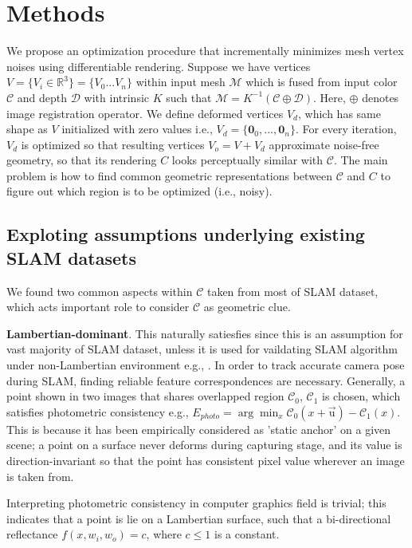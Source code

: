 \section{Methods}

We propose an optimization procedure that incrementally minimizes mesh vertex noises using differentiable rendering. 
Suppose we have vertices $V=\{V_i\in\mathbb{R}^3\}=\{V_0...V_n\}$ within input mesh $\mathcal{M}$ which is fused from input color $\mathcal{C}$ and depth $\mathcal{D}$ with intrinsic $K$ such that $\mathcal{M}=K^{-1}\left(\mathcal{C}\oplus \mathcal{D}\right)$. 
Here, $\oplus$ denotes image registration operator.
We define deformed vertices $V_d$, which has same shape as $V$ initialized with zero values i.e., $V_d=\{\mathbf{0}_0,...,\mathbf{0}_n\}$. 
For every iteration, $V_d$ is optimized so that resulting vertices $V_o=V+V_d$ approximate noise-free geometry, so that its rendering $C$ looks perceptually similar with $\mathcal{C}$. 
The main problem is how to find common geometric representations between $\mathcal{C}$ and $C$ to figure out which region is to be optimized (i.e., noisy). 

\subsection{Exploting assumptions underlying existing SLAM datasets}
We found two common aspects within $\mathcal{C}$ taken from most of SLAM dataset, which acts important role to consider $\mathcal{C}$ as geometric clue.

\noindent \textbf{Lambertian-dominant}. 
This naturally satiesfies since this is an assumption for vast majority of SLAM dataset, unless it is used for vaildating SLAM algorithm under non-Lambertian environment e.g., \cite{whelan2018reconstructing}. 
In order to track accurate camera pose during SLAM, finding reliable feature correspondences are necessary.
Generally, a point shown in two images that shares overlapped region $\mathcal{C}_0$, $\mathcal{C}_1$ is chosen, which satisfies photometric consistency e.g., $E_{photo}=\arg\min_x \mathcal{C}_0\left(x+\overrightarrow{\mathrm{u}}\right)-\mathcal{C}_1\left(x\right)$. \cite{szeliski2010computer}
This is because it has been empirically considered as 'static anchor' on a given scene; a point on a surface never deforms during capturing stage, and its value is direction-invariant so that the point has consistent pixel value wherever an image is taken from. 

Interpreting photometric consistency in computer graphics field is trivial; this indicates that a point is lie on a Lambertian surface, such that a bi-directional reflectance $f(x, w_i, w_o)=c$, where $c\le 1$ is a constant.


